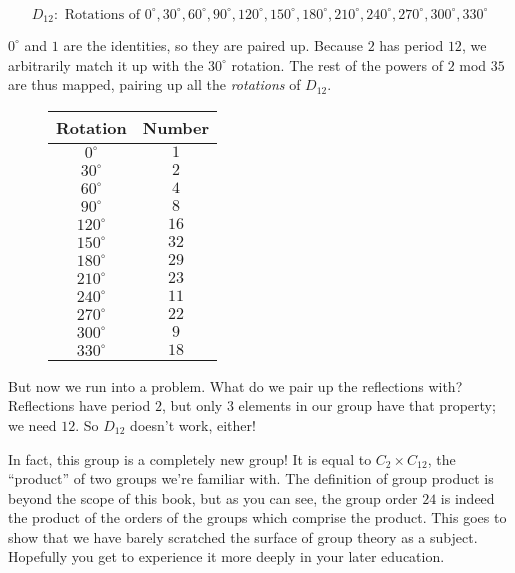 \documentclass[../gatm.tex]{subfiles}
\begin{document}
$$D_{12}:\text{ Rotations of } 0^\circ, 30^\circ, 60^\circ, 90^\circ, 120^\circ, 150^\circ, 180^\circ, 210^\circ, 240^\circ, 270^\circ, 300^\circ, 330^\circ$$

\noindent$0^\circ$ and $1$ are the identities, so they are paired up. Because $2$ has period $12$, we arbitrarily match it up with the $30^\circ$ rotation. The rest of the powers of $2$ mod $35$ are thus mapped, pairing up all the \textit{rotations} of $D_{12}$.

\vspace*{3\baselineskip}

\begin{figure}[h]
	\begin{center}
		\begin{minipage}[b]{\textwidth}
			\centering
			\begin{tabular}{cc}
				\hline
				Rotation & Number \\ \hline
				\rowcolor{light-gray}
				$0^\circ$ & $1$ \\
				$30^\circ$ & $2$ \\
				\rowcolor{light-gray}
				$60^\circ$ & $4$ \\
				$90^\circ$ & $8$ \\
				\rowcolor{light-gray}
				$120^\circ$ & $16$ \\
				$150^\circ$ & $32$ \\
				\rowcolor{light-gray}
				$180^\circ$ & $29$ \\
				$210^\circ$ & $23$ \\
				\rowcolor{light-gray}
				$240^\circ$ & $11$ \\
				$270^\circ$ & $22$ \\
				\rowcolor{light-gray}
				$300^\circ$ & $9$ \\
				$330^\circ$ & $18$ \\ \hline
			\end{tabular}
		\end{minipage}
	\end{center}
\end{figure}


\noindent But now we run into a problem. What do we pair up the reflections with? Reflections have period $2$, but only $3$ elements in our group have that property; we need $12$. So $D_{12}$ doesn't work, either!

In fact, this group is a completely new group! It is equal to $C_2\times C_{12}$, the ``product'' of two groups we're familiar with. The definition of group product is beyond the scope of this book, but as you can see, the group order $24$ is indeed the product of the orders of the groups which comprise the product. This goes to show that we have barely scratched the surface of group theory as a subject. Hopefully you get to experience it more deeply in your later education.
\end{document}
